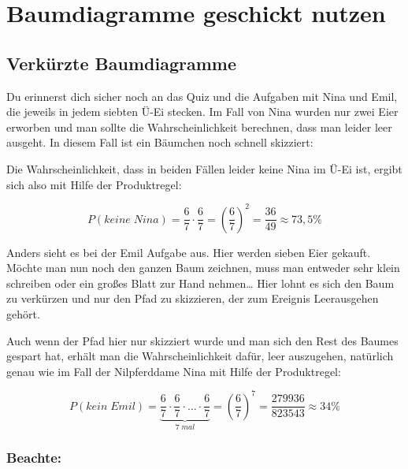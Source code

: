 \documentclass[
  ngerman,
]{book}
\begin{document}
\hypertarget{section-153}{%
\subsubsection*{}\label{section-153}}

\hypertarget{baumdiagramme-geschickt-nutzen}{%
\section{Baumdiagramme geschickt nutzen}\label{baumdiagramme-geschickt-nutzen}}

\hypertarget{verkuxfcrzte-baumdiagramme}{%
\subsection{Verkürzte Baumdiagramme}\label{verkuxfcrzte-baumdiagramme}}

Du erinnerst dich sicher noch an das Quiz und die Aufgaben mit Nina und Emil, die jeweils in jedem siebten Ü-Ei stecken. Im Fall von Nina wurden nur zwei Eier erworben und man sollte die Wahrscheinlichkeit berechnen, dass man leider leer ausgeht. In diesem Fall ist ein Bäumchen noch schnell skizziert:

Die Wahrscheinlichkeit, dass in beiden Fällen leider keine Nina im Ü-Ei ist, ergibt sich also mit Hilfe der Produktregel:

\[P(keine\;Nina)= \frac{6}{7} \cdot \frac{6}{7} = (\frac{6}{7})^2 = \frac{36}{49} \approx 73,5\%\]

Anders sieht es bei der Emil Aufgabe aus. Hier werden sieben Eier gekauft. Möchte man nun noch den ganzen Baum zeichnen, muss man entweder sehr klein schreiben oder ein großes Blatt zur Hand nehmen\ldots{} Hier lohnt es sich den Baum zu verkürzen und nur den Pfad zu skizzieren, der zum Ereignis Leerausgehen gehört.

Auch wenn der Pfad hier nur skizziert wurde und man sich den Rest des Baumes gespart hat, erhält man die Wahrscheinlichkeit dafür, leer auszugehen, natürlich genau wie im Fall der Nilpferddame Nina mit Hilfe der Produktregel:

\[P(kein\;Emil)= \underbrace{\frac{6}{7} \cdot \frac{6}{7} \cdot \dots \cdot \frac{6}{7}}_{7\;mal} = (\frac{6}{7})^7 = \frac{279936}{823543} \approx 34\%\]

\hypertarget{beachte-1}{%
\subsubsection*{Beachte:}\label{beachte-1}}
\end{document}
